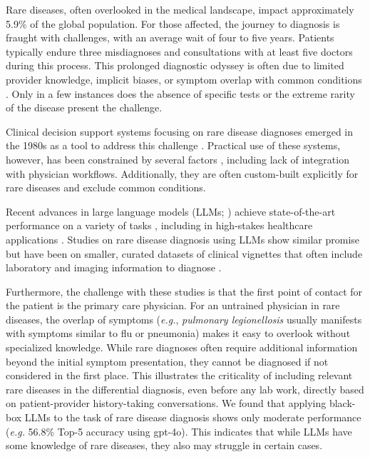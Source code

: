 

Rare diseases, often overlooked in the medical landscape, impact approximately 5.9\%  of the global population. For those affected, the journey to diagnosis is fraught with challenges, with an average wait of four to five years. Patients typically endure three misdiagnoses and consultations with at least five doctors during this process. This prolonged diagnostic odyssey is often due to limited provider knowledge, implicit biases, or symptom overlap with common conditions \cite{Kliegman17, Gao2021}. Only in a few instances does the absence of specific tests or the extreme rarity of the disease present the challenge.

Clinical decision support systems focusing on rare disease diagnoses emerged in the 1980s as a tool to address this challenge \citet{miller_internist-1_1982, mycin, barnett_dxplain:_1987, ExpertSystemsProbabilities, JacksonExpertSystems}. Practical use of these systems, however, has been constrained by several factors \cite{Miller94}, including lack of integration with physician workflows. Additionally, they are often custom-built explicitly for rare diseases and exclude common conditions.

Recent advances in large language models (LLMs; \citet{openai2024gpt4ocard, TheC3,grattafiori2024llama3herdmodels,jiang2023mistral}) achieve state-of-the-art performance on a variety of tasks \cite{zheng2023MT,wang2019super,hendrycksmeasuring}, including in high-stakes healthcare applications \cite{chen2023meditron70bscalingmedicalpretraining,thawakar-etal-2024-xraygpt,nair-etal-2024-dera}.  
Studies on rare disease diagnosis using LLMs show similar promise but have been on smaller, curated datasets of clinical vignettes that often include laboratory and imaging information to diagnose \cite{hu2023can,shyr2024identifying,sandmann2024systematic,chen2024rarebench,yang2024rdmaster,yang2024rdguru,mehnen2023chatgpt,shyr2024identifying,Olmo2024AssessingDD}.


Furthermore, the challenge with these studies is that 
the first point of contact for the patient is the primary care physician. For an untrained physician in rare diseases, the overlap of symptoms (\textit{e.g.}, \textit{pulmonary legionellosis} usually manifests with symptoms similar to flu or pneumonia)  makes it easy to overlook without specialized knowledge. While rare diagnoses often require additional information beyond the initial symptom presentation, they cannot be diagnosed if not considered in the first place.   This illustrates the criticality of including relevant rare diseases in the differential diagnosis, even before any lab work, directly based on patient-provider history-taking conversations. We found that applying black-box LLMs to the task of rare disease diagnosis shows only moderate performance (\textit{e.g.} 56.8\% Top-5 accuracy using gpt-4o).  This indicates that while LLMs have some knowledge of rare diseases, they also may struggle in certain cases.


